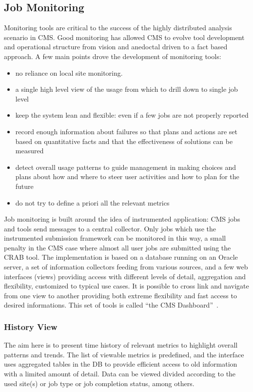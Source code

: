 \subsection{Job Monitoring}
\label{sec:3_3}
Monitoring tools are critical to the success of the
highly distributed analysis scenario in CMS.
Good monitoring has allowed CMS to evolve tool development
and operational structure from vision and anedoctal driven
to a fact based approach.
A few main points drove the development of monitoring tools:
\begin{itemize}
\item no reliance on local site monitoring.
\item a single  high level view of the usage from which
  to drill down to single job level
\item   keep the system lean and flexible: even if a few
  jobs are not properly reported
\item record
  enough information about failures so that plans and actions are set
  based on quantitative facts and that  the effectiveness of solutions can be measured 
\item detect overall usage patterns to guide management in making
 choices and plans about how and where to steer user activities and
 how to plan for the future
\item do not try to define a priori all the relevant metrics
\end{itemize}

Job monitoring is built around the idea of instrumented
application: CMS jobs and tools send messages
to a central collector. Only jobs which use the
instrumented submission framework can be monitored in this way,
a small penalty in the CMS case where almost
all user jobs are submitted using the CRAB tool.
The implementation is based on a
database running on an Oracle server, a set of information collectors
feeding from various sources, 
and a few web interfaces (views) providing access with different levels
of detail, aggregation and flexibility, customized to
typical use cases. It is possible to cross link and navigate
from one view to another providing both extreme flexibility
and fast access to desired informations.
This set of tools is called ``the CMS Dashboard''~\cite{RefDashBoard}.

\subsubsection{History View}
The aim here is to present time history of relevant
metrics to highlight overall patterns and trends.
The list of viewable metrics is predefined, and
the interface uses aggregated tables in the DB to provide
efficient access to old information with a limited
amount of detail. Data can be viewed divided
according to the used site(s) or job type or job completion status, among others.

